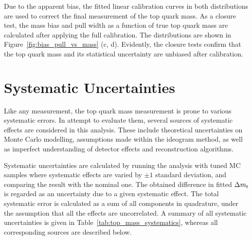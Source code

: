 Due to the apparent bias, the fitted linear calibration curves in both distributions are used to correct the final
measurement of the top quark mass. As a closure test, the mass bias and pull width as a function of true top quark mass
are calculated after applying the full calibration. The distributions are shown in Figure~\ref{fig:bias_pull_vs_mass}
(c, d). Evidently, the closure tests confirm that the top quark mass and its statistical uncertainty are unbiased after
calibration.

 

\section{Systematic Uncertainties}
\label{s_top_mass:systematics}

Like any measurement, the top quark mass measurement is prone to various systematic errors. In attempt to evaluate them,
several sources of systematic effects are considered in this analysis. These include theoretical uncertainties on Monte
Carlo modelling, assumptions made within the ideogram method, as well as imperfect understanding of detector effects and
reconstruction algorithms.

Systematic uncertainties are calculated by running the analysis with tuned MC samples where systematic effects are
varied by $\pm 1$ standard deviation, and comparing the result with the nominal one. The obtained difference in fitted
$\Delta m_\mathrm{t}$ is regarded as an uncertainty due to a given systematic effect. The total systematic error is calculated
as a sum of all components in quadrature, under the assumption that all the effects are uncorrelated. A summary of all
systematic uncertainties is given in Table~\ref{tab:top_mass_systematics}, whereas all corresponding sources are
described below.


